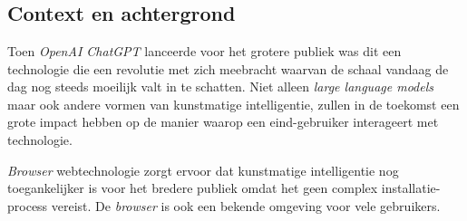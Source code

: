 
\chapter{}
\label{ch:inleiding}



\section{Context en achtergrond} %
Toen \textit{OpenAI ChatGPT} lanceerde voor het grotere publiek was dit een technologie die een revolutie met zich meebracht waarvan de schaal vandaag de dag nog steeds moeilijk valt in te schatten. Niet alleen \textit{large language models} maar ook andere vormen van kunstmatige intelligentie, zullen in de toekomst een grote impact hebben op de manier waarop een eind-gebruiker interageert met technologie. \autocite{Marr2023}

\bigbreak{}

\textit{Browser} webtechnologie zorgt ervoor dat kunstmatige intelligentie nog toegankelijker is voor het bredere publiek omdat het geen complex in\-sta\-lla\-tie-pro\-cess vereist. De \textit{browser} is ook een bekende omgeving voor vele gebruikers.

